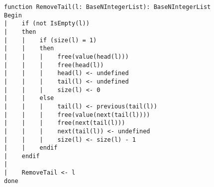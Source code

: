\begin{lstlisting}[breaklines]
function RemoveTail(l: BaseNIntegerList): BaseNIntegerList
Begin
|    if (not IsEmpty(l))
|    then
|    |    if (size(l) = 1)
|    |    then
|    |    |    free(value(head(l)))
|    |    |    free(head(l))
|    |    |    head(l) <- undefined
|    |    |    tail(l) <- undefined
|    |    |    size(l) <- 0
|    |    else
|    |    |    tail(l) <- previous(tail(l))
|    |    |    free(value(next(tail(l))))
|    |    |    free(next(tail(l)))
|    |    |    next(tail(l)) <- undefined
|    |    |    size(l) <- size(l) - 1
|    |    endif
|    endif
|
|    RemoveTail <- l
done
\end{lstlisting}
